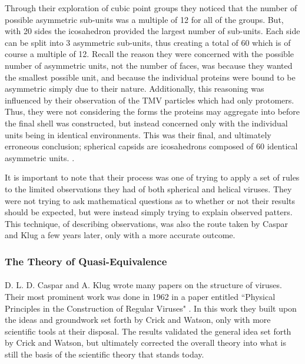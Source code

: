 \documentclass[12pt,letter]{article}
\begin{document}
Through their exploration of cubic point groups they noticed that the number of possible asymmetric sub-units was a multiple of 12 for all of the groups. But, with 20 sides the icosahedron provided the largest number of sub-units. Each side can be split into 3 asymmetric sub-units, thus creating a total of 60 which is of course a multiple of 12. Recall the reason they were concerned with the possible number of asymmetric units, not the number of faces, was because they wanted the smallest possible unit, and because the individual proteins were bound to be asymmetric simply due to their nature. Additionally, this reasoning was influenced by their observation of the TMV particles which had only protomers. Thus, they were not considering the forms the proteins may aggregate into before the final shell was constructed, but instead concerned only with the individual units being in identical environments. This was their final, and ultimately erroneous conclusion; spherical capsids are icosahedrons composed of 60 identical asymmetric units. \cite[p 475]{Crick:1956}.

It is important to note that their process was one of trying to apply a set of rules to the limited observations they had of both spherical and helical viruses. They were not trying to ask mathematical questions as to whether or not their results should be expected, but were instead simply trying to explain observed patters. This technique, of describing observations, was also the route taken by Caspar and Klug a few years later, only with a more accurate outcome.

\subsubsection{The Theory of Quasi-Equivalence} \label{sec:CK}
\paragraph{}

D. L. D. Caspar and  A. Klug wrote many papers on the structure of viruses. Their most prominent work was done in 1962 in a paper entitled ``Physical Principles in the Construction of Regular Viruses" \cite{Caspar:1962}. In this work they built upon the ideas and groundwork set forth by Crick and Watson, only with more scientific tools at their disposal. The results validated the general idea set forth by Crick and Watson, but ultimately corrected the overall theory into what is still the basis of the scientific theory that stands today.
\end{document}

